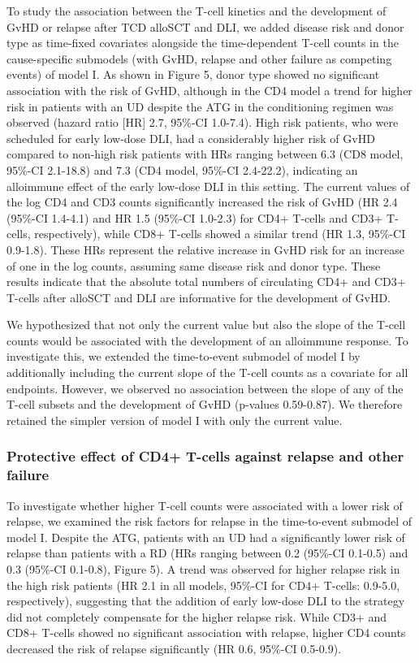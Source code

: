 \documentclass[
  letterpaper,
  DIV=11,
  numbers=noendperiod]{scrreprt}
\begin{document}
To study the association between the T-cell kinetics and the development
of GvHD or relapse after TCD alloSCT and DLI, we added disease risk and
donor type as time-fixed covariates alongside the time-dependent T-cell
counts in the cause-specific submodels (with GvHD, relapse and other
failure as competing events) of model I. As shown in Figure 5, donor
type showed no significant association with the risk of GvHD, although
in the CD4 model a trend for higher risk in patients with an UD despite
the ATG in the conditioning regimen was observed (hazard ratio {[}HR{]}
2.7, 95\%-CI 1.0-7.4). High risk patients, who were scheduled for early
low-dose DLI, had a considerably higher risk of GvHD compared to
non-high risk patients with HRs ranging between 6.3 (CD8 model, 95\%-CI
2.1-18.8) and 7.3 (CD4 model, 95\%-CI 2.4-22.2), indicating an
alloimmune effect of the early low-dose DLI in this setting. The current
values of the log CD4 and CD3 counts significantly increased the risk of
GvHD (HR 2.4 (95\%-CI 1.4-4.1) and HR 1.5 (95\%-CI 1.0-2.3) for CD4+
T-cells and CD3+ T-cells, respectively), while CD8+ T-cells showed a
similar trend (HR 1.3, 95\%-CI 0.9-1.8). These HRs represent the
relative increase in GvHD risk for an increase of one in the log counts,
assuming same disease risk and donor type. These results indicate that
the absolute total numbers of circulating CD4+ and CD3+ T-cells after
alloSCT and DLI are informative for the development of GvHD.

We hypothesized that not only the current value but also the slope of
the T-cell counts would be associated with the development of an
alloimmune response. To investigate this, we extended the time-to-event
submodel of model I by additionally including the current slope of the
T-cell counts as a covariate for all endpoints. However, we observed no
association between the slope of any of the T-cell subsets and the
development of GvHD (p-values 0.59-0.87). We therefore retained the
simpler version of model I with only the current value.

\hypertarget{protective-effect-of-cd4-t-cells-against-relapse-and-other-failure}{%
\subsubsection{Protective effect of CD4+ T-cells against relapse and
other
failure}\label{protective-effect-of-cd4-t-cells-against-relapse-and-other-failure}}

To investigate whether higher T-cell counts were associated with a lower
risk of relapse, we examined the risk factors for relapse in the
time-to-event submodel of model I. Despite the ATG, patients with an UD
had a significantly lower risk of relapse than patients with a RD (HRs
ranging between 0.2 (95\%-CI 0.1-0.5) and 0.3 (95\%-CI 0.1-0.8), Figure
5). A trend was observed for higher relapse risk in the high risk
patients (HR 2.1 in all models, 95\%-CI for CD4+ T-cells: 0.9-5.0,
respectively), suggesting that the addition of early low-dose DLI to the
strategy did not completely compensate for the higher relapse risk.
While CD3+ and CD8+ T-cells showed no significant association with
relapse, higher CD4 counts decreased the risk of relapse significantly
(HR 0.6, 95\%-CI 0.5-0.9).
\end{document}
